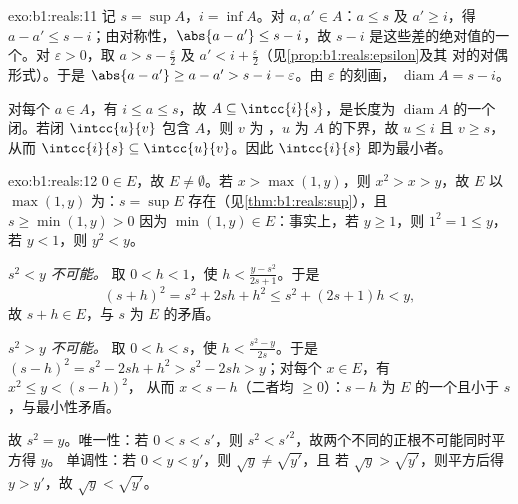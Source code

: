 \begin{solution}{exo:b1:reals:11}
记 $s = \sup A$，$i = \inf A$。对 $a, a' \in A$：$a \leq s$
及 $a' \geq i$，得 $a - a' \leq s - i$；由对称性，$\abs{a -
a'} \leq s - i$，故 $s - i$ 是这些差的绝对值的一个。对
$\varepsilon > 0$，取 $a > s - \frac\varepsilon2$ 及 $a' < i
+ \frac\varepsilon2$（见\cref{prop:b1:reals:epsilon}及其
对的对偶形式）。于是 $\abs{a - a'} \geq a - a' > s - i -
\varepsilon$。由 $\varepsilon$ 的刻画，
$\operatorname{diam} A = s - i$。

对每个 $a \in A$，有 $i \leq a \leq s$，故 $A \subseteq
\intcc{i}{s}$，是长度为 $\operatorname{diam}
A$ 的一个闭。若闭 $\intcc{u}{v}$ 包含 $A$，则 $v$ 为
，$u$ 为 $A$ 的下界，故 $u \leq i$ 且 $v
\geq s$，从而 $\intcc{i}{s} \subseteq \intcc{u}{v}$。因此
$\intcc{i}{s}$ 即为最小者。
\end{solution}

\begin{solution}{exo:b1:reals:12}
$0 \in E$，故 $E \neq \emptyset$。若 $x > \max(1, y)$，则 $x^2 >
x > y$，故 $E$ 以 $\max(1, y)$ 为：$s = \sup E$
存在（见\cref{thm:b1:reals:sup}），且 $s \geq \min(1, y) > 0$
因为 $\min(1, y) \in E$：事实上，若 $y \geq 1$，则 $1^2 = 1
\leq y$，若 $y < 1$，则 $y^2 < y$。

\emph{$s^2 < y$ 不可能。} 取 $0 < h < 1$，使 $h <
\frac{y - s^2}{2s + 1}$。于是
\[
(s + h)^2 = s^2 + 2sh + h^2 \leq s^2 + (2s + 1)h < y ,
\]
故 $s + h \in E$，与 $s$ 为 $E$ 的矛盾。

\emph{$s^2 > y$ 不可能。} 取 $0 < h < s$，使 $h <
\frac{s^2 - y}{2s}$。于是 $(s - h)^2 = s^2 - 2sh + h^2 > s^2 -
2sh > y$；对每个 $x \in E$，有 $x^2 \leq y < (s - h)^2$，
从而 $x < s - h$（二者均 $\geq 0$）：$s - h$ 为
$E$ 的一个且小于 $s$，与最小性矛盾。

故 $s^2 = y$。唯一性：若 $0 < s < s'$，则 $s^2 <
s'^2$，故两个不同的正根不可能同时平方得 $y$。
单调性：若 $0 < y < y'$，则 $\sqrt y \neq \sqrt{y'}$，且
若 $\sqrt y > \sqrt{y'}$，则平方后得 $y > y'$，故 $\sqrt
y < \sqrt{y'}$。
\end{solution}

